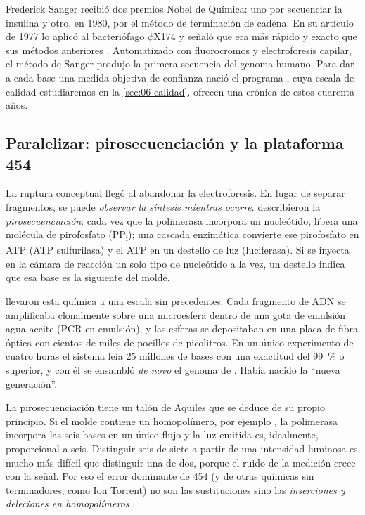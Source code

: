 \begin{historia}
Frederick Sanger recibió dos premios Nobel de Química: uno por secuenciar la insulina y otro, en 1980, por el método de terminación de cadena. En su artículo de 1977 lo aplicó al bacteriófago $\phi$X174 y señaló que era más rápido y exacto que sus métodos anteriores \parencite{c06-sanger1977}. Automatizado con fluorocromos y electroforesis capilar, el método de Sanger produjo la primera secuencia del genoma humano. Para dar a cada base una medida objetiva de confianza nació el programa  \parencite{c06-ewing1998a}, cuya escala de calidad estudiaremos en la \cref{sec:06-calidad}. \textcite{c06-shendure2017} ofrecen una crónica de estos cuarenta años.
\end{historia}

\subsection{Paralelizar: pirosecuenciación y la plataforma 454}

La ruptura conceptual llegó al abandonar la electroforesis. En lugar de separar fragmentos, se puede \emph{observar la síntesis mientras ocurre}. \textcite{c06-ronaghi1998} describieron la \emph{pirosecuenciación}: cada vez que la polimerasa incorpora un nucleótido, libera una molécula de pirofosfato (PP\textsubscript{i}); una cascada enzimática convierte ese pirofosfato en ATP (ATP sulfurilasa) y el ATP en un destello de luz (luciferasa). Si se inyecta en la cámara de reacción un solo tipo de nucleótido a la vez, un destello indica que esa base es la siguiente del molde.

\textcite{c06-margulies2005} llevaron esta química a una escala sin precedentes. Cada fragmento de ADN se amplificaba clonalmente sobre una microesfera dentro de una gota de emulsión agua-aceite (PCR en emulsión), y las esferas se depositaban en una placa de fibra óptica con cientos de miles de pocillos de picolitros. En un único experimento de cuatro horas el sistema leía 25 millones de bases con una exactitud del \SI{99}{\percent} o superior, y con él se ensambló \emph{de novo} el genoma de . Había nacido la ``nueva generación''.

La pirosecuenciación tiene un talón de Aquiles que se deduce de su propio principio. Si el molde contiene un homopolímero, por ejemplo , la polimerasa incorpora las seis bases en un único flujo y la luz emitida es, idealmente, proporcional a seis. Distinguir seis de siete a partir de una intensidad luminosa es mucho más difícil que distinguir una de dos, porque el ruido de la medición crece con la señal. Por eso el error dominante de 454 (y de otras químicas sin terminadores, como Ion Torrent) no son las sustituciones sino las \emph{inserciones y deleciones en homopolímeros} \parencite{c06-metzker2010}.


